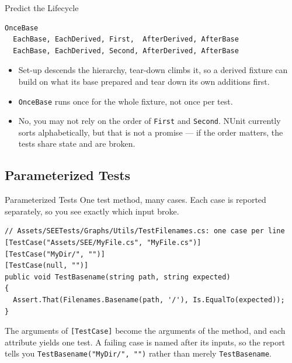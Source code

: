 \begin{solutionframe}{Predict the Lifecycle}
  \begin{lstlisting}[language={},basicstyle=\scriptsize\ttfamily]
OnceBase
  EachBase, EachDerived, First,  AfterDerived, AfterBase
  EachBase, EachDerived, Second, AfterDerived, AfterBase
  \end{lstlisting}
  \begin{itemize}
    \item Set-up descends the hierarchy, tear-down climbs it, so a derived
      fixture can build on what its base prepared and tear down its own
      additions first.
    \item \texttt{OnceBase} runs once for the whole fixture, not once per test.
    \item No, you may not rely on the order of \texttt{First} and
      \texttt{Second}. NUnit currently sorts alphabetically, but that is not a
      promise --- if the order matters, the tests share state and are broken.
  \end{itemize}
  \vspace{2ex}

\end{solutionframe}

\subsection{Parameterized Tests}

\begin{frame}[fragile]{Parameterized Tests}
  One test method, many cases. Each case is reported separately, so you see
  exactly which input broke.
  \vspace{1ex}

  \begin{lstlisting}[basicstyle=\scriptsize\ttfamily]
// Assets/SEETests/Graphs/Utils/TestFilenames.cs: one case per line
[TestCase("Assets/SEE/MyFile.cs", "MyFile.cs")]
[TestCase("MyDir/", "")]
[TestCase(null, "")]
public void TestBasename(string path, string expected)
{
  Assert.That(Filenames.Basename(path, '/'), Is.EqualTo(expected));
}
  \end{lstlisting}
  \vspace{1ex}

  The arguments of \texttt{[TestCase]} become the arguments of the method, and
  each attribute yields one test. A failing case is named after its inputs, so
  the report tells you \texttt{TestBasename("MyDir/", "")} rather than merely
  \texttt{TestBasename}.
\end{frame}


